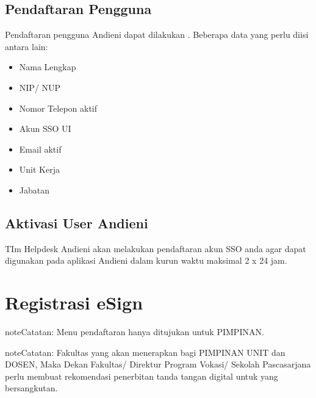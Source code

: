 \documentclass[letterpaper,10pt,bahasai]{sphinxmanual}
\begin{document}
\section{Pendaftaran Pengguna}
\label{\detokenize{daftarPengguna:pendaftaran-pengguna}}
Pendaftaran pengguna Andieni dapat dilakukan  .
Beberapa data yang perlu diisi antara lain:
\begin{itemize}
\item {} 
Nama Lengkap

\item {} 
NIP/ NUP

\item {} 
Nomor Telepon aktif

\item {} 
Akun SSO UI

\item {} 
Email aktif

\item {} 
Unit Kerja

\item {} 
Jabatan

\end{itemize}


\section{Aktivasi User Andieni}
\label{\detokenize{daftarPengguna:aktivasi-user-andieni}}
TIm Helpdesk Andieni akan melakukan pendaftaran akun SSO anda agar dapat digunakan pada aplikasi Andieni dalam kurun
waktu maksimal 2 x 24 jam.


\chapter{Registrasi eSign}
\label{\detokenize{daftar_eSign:registrasi-esign}}\label{\detokenize{daftar_eSign::doc}}
\begin{sphinxadmonition}{note}{Catatan:}
Menu pendaftaran hanya ditujukan untuk PIMPINAN.
\end{sphinxadmonition}

\begin{sphinxadmonition}{note}{Catatan:}
Fakultas yang akan menerapkan bagi PIMPINAN UNIT dan DOSEN, Maka Dekan Fakultas/ Direktur Program Vokasi/ Sekolah Pascasarjana perlu membuat rekomendasi penerbitan tanda tangan digital untuk yang bersangkutan.
\end{sphinxadmonition}
\end{document}
